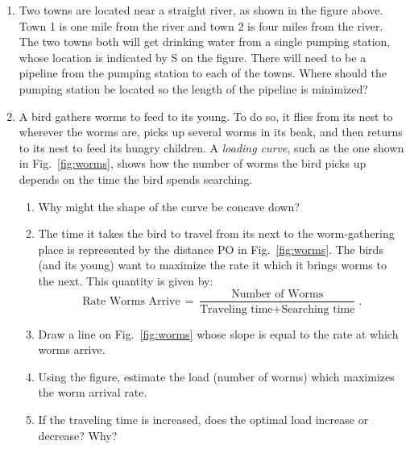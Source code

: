 \documentclass[12pt]{article}
\begin{document}
\begin{enumerate}
\setlength{\itemsep}{8mm}

\item Two towns are located near a straight river, as shown in the
  figure above. Town 1 is one mile from the river and town 2 is four
  miles from the river. The two towns both will get drinking water
  from a single pumping station, whose location is indicated by S on
  the figure. There will need to be a pipeline from the pumping
  station to each of the towns. Where should the pumping station be
  located so the length of the pipeline is minimized? 

\newpage
  
\item A bird gathers worms to feed to its young.  To do so, it flies
  from its nest to wherever the worms are, picks up several worms in
  its beak, and then returns to its nest to feed its hungry
  children. A \emph{loading curve}, such as the one shown in
  Fig.~\ref{fig:worms}, shows how the number of worms the bird picks
  up depends on the time the bird spends searching.
  \begin{enumerate}
    \setlength{\itemsep}{1mm}
  \item Why might the shape of the curve be concave down?  
  \item The time it takes the bird to travel from its next to the
    worm-gathering place is represented by the distance PO in
    Fig.~\ref{fig:worms}.  The birds (and its young) want to maximize
    the rate it which it brings worms to the next. This quantity is
    given by:
    \begin{equation}
      \text{Rate Worms Arrive} \, = \, \frac{\text{Number of
          Worms}}{\text{Traveling time} + \text{Searching time}} \;.
    \end{equation}
    \item Draw a line on Fig.~\ref{fig:worms} whose slope is equal to
      the rate at which worms arrive.
    \item Using the figure, estimate the load (number of worms) which
      maximizes the worm arrival rate.
    \item If the traveling time is increased, does the optimal load
      increase or decrease?  Why?
  \end{enumerate}



\end{enumerate}
\end{document}
